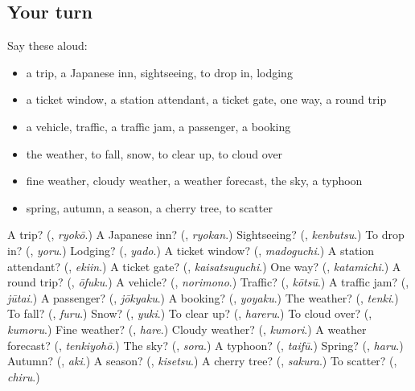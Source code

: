 \subsection*{Your turn}
Say these aloud:

\begin{itemize}
\raggedright
  \item a trip, a Japanese inn, sightseeing, to drop in, lodging
  \item a ticket window, a station attendant, a ticket gate, one way, a round trip
  \item a vehicle, traffic, a traffic jam, a passenger, a booking
  \item the weather, to fall, snow, to clear up, to cloud over
  \item fine weather, cloudy weather, a weather forecast, the sky, a typhoon
  \item spring, autumn, a season, a cherry tree, to scatter
\end{itemize}

\begin{tcolorbox}[breakable,colback=teal!4,colframe=teal!35!black,title={Before you move on}]
A trip? (\textbf{}, \emph{ryokō}.) A Japanese inn? (\textbf{}, \emph{ryokan}.) Sightseeing? (\textbf{}, \emph{kenbutsu}.) To drop in? (\textbf{}, \emph{yoru}.) Lodging? (\textbf{}, \emph{yado}.) A ticket window? (\textbf{}, \emph{madoguchi}.) A station attendant? (\textbf{}, \emph{ekiin}.) A ticket gate? (\textbf{}, \emph{kaisatsuguchi}.) One way? (\textbf{}, \emph{katamichi}.) A round trip? (\textbf{}, \emph{ōfuku}.) A vehicle? (\textbf{}, \emph{norimono}.) Traffic? (\textbf{}, \emph{kōtsū}.) A traffic jam? (\textbf{}, \emph{jūtai}.) A passenger? (\textbf{}, \emph{jōkyaku}.) A booking? (\textbf{}, \emph{yoyaku}.) The weather? (\textbf{}, \emph{tenki}.) To fall? (\textbf{}, \emph{furu}.) Snow? (\textbf{}, \emph{yuki}.) To clear up? (\textbf{}, \emph{hareru}.) To cloud over? (\textbf{}, \emph{kumoru}.) Fine weather? (\textbf{}, \emph{hare}.) Cloudy weather? (\textbf{}, \emph{kumori}.) A weather forecast? (\textbf{}, \emph{tenkiyohō}.) The sky? (\textbf{}, \emph{sora}.) A typhoon? (\textbf{}, \emph{taifū}.) Spring? (\textbf{}, \emph{haru}.) Autumn? (\textbf{}, \emph{aki}.) A season? (\textbf{}, \emph{kisetsu}.) A cherry tree? (\textbf{}, \emph{sakura}.) To scatter? (\textbf{}, \emph{chiru}.)
\end{tcolorbox}
